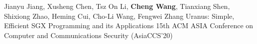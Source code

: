 \cvpub
{Jianyu Jiang, Xusheng Chen, Tsz On Li, \textbf{Cheng Wang}, Tianxiang Shen, Shixiong Zhao, Heming Cui, Cho-Li Wang, Fengwei Zhang} %
{Uranus: Simple, Efficient SGX Programming and its Applications} %
{} %
{} %
{ %
15th ACM ASIA Conference on Computer and Communications Security (AsiaCCS'20)\newline
}
